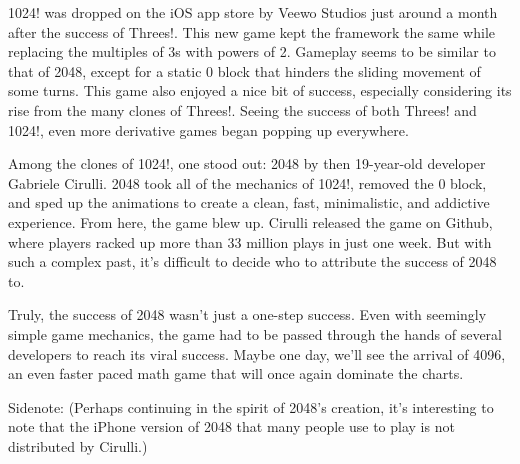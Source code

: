 \documentclass{article}
\begin{document}
1024! was dropped on the iOS app store by Veewo Studios just around a month after the success of Threes!. This new game kept the framework the same while replacing the multiples of 3s with powers of 2. Gameplay seems to be similar to that of 2048, except for a static 0 block that hinders the sliding movement of some turns. This game also enjoyed a nice bit of success, especially considering its rise from the many clones of Threes!. Seeing the success of both Threes! and 1024!, even more derivative games began popping up everywhere.

Among the clones of 1024!, one stood out: 2048 by then 19-year-old developer Gabriele Cirulli. 2048 took all of the mechanics of 1024!, removed the 0 block, and sped up the animations to create a clean, fast, minimalistic, and addictive experience. From here, the game blew up. Cirulli released the game on Github, where players racked up more than 33 million plays in just one week. But with such a complex past, it’s difficult to decide who to attribute the success of 2048 to.

Truly, the success of 2048 wasn’t just a one-step success. Even with seemingly simple game mechanics, the game had to be passed through the hands of several developers to reach its viral success. Maybe one day, we’ll see the arrival of 4096, an even faster paced math game that will once again dominate the charts.

Sidenote: (Perhaps continuing in the spirit of 2048’s creation, it’s interesting to note that the iPhone version of 2048 that many people use to play is not distributed by Cirulli.)
\end{document}
